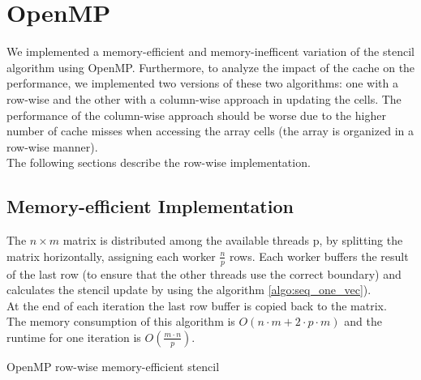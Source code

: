 \documentclass[11pt,a4paper]{article}
\begin{document}

\section{OpenMP}
We implemented a memory-efficient and memory-inefficent variation of the stencil algorithm using OpenMP.
Furthermore, to analyze the impact of the cache on the performance, we implemented two versions of these two algorithms: one with a row-wise and the other with a column-wise approach in updating the cells. The performance of the column-wise approach should be worse due to the higher number of cache misses when accessing the array cells (the array is organized in a row-wise manner).\\
The following sections describe the row-wise implementation.

\subsection{Memory-efficient Implementation}
The $n\times m$ matrix is distributed among the available threads p, by splitting the matrix horizontally, assigning each worker $\frac{n}{p}$ rows. Each worker buffers the result of the last row (to ensure that the other threads use the correct boundary) and calculates the stencil update by using the algorithm \ref{algo:seq_one_vec}).\\
At the end of each iteration the last row buffer is copied back to the matrix.\\
The memory consumption of this algorithm is $O(n \cdot m + 2 \cdot p \cdot m)$ and the runtime for one iteration is $O(\frac{m \cdot n}{p})$.\\

\begin{algorithm}[H] \label{algo:cilk}
 \caption{OpenMP row-wise memory-efficient stencil}
\end{algorithm}
\end{document}
